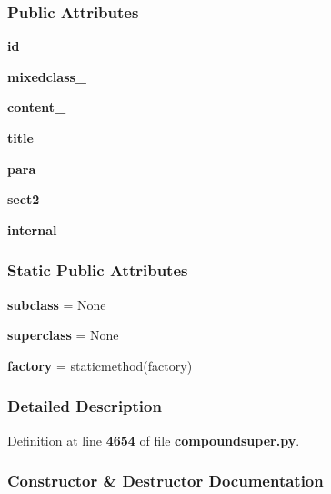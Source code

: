 \subsubsection*{Public Attributes}
\begin{DoxyCompactItemize}
\item 
{\bf id}
\item 
{\bf mixedclass\+\_\+}
\item 
{\bf content\+\_\+}
\item 
{\bf title}
\item 
{\bf para}
\item 
{\bf sect2}
\item 
{\bf internal}
\end{DoxyCompactItemize}
\subsubsection*{Static Public Attributes}
\begin{DoxyCompactItemize}
\item 
{\bf subclass} = None
\item 
{\bf superclass} = None
\item 
{\bf factory} = staticmethod(factory)
\end{DoxyCompactItemize}


\subsubsection{Detailed Description}


Definition at line {\bf 4654} of file {\bf compoundsuper.\+py}.



\subsubsection{Constructor \& Destructor Documentation}
